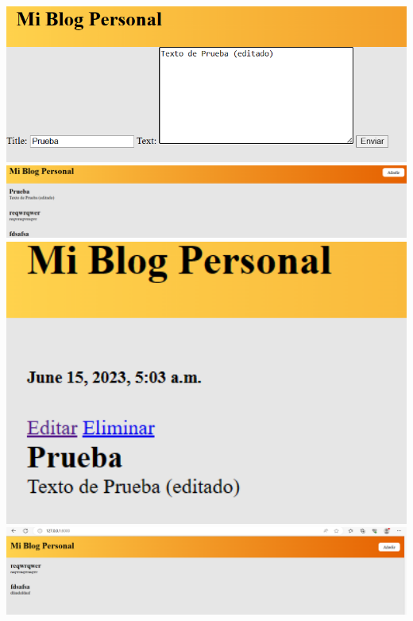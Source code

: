 \documentclass{article}
\begin{document}
        \includegraphics[width=16cm]{img/ejecucion5.png}
        \includegraphics[width=16cm]{img/ejecucion6.png}
        \includegraphics[width=16cm]{img/ejecucion7.png}
        \includegraphics[width=16cm]{img/ejecucion8.png}
        
        
\end{document}

